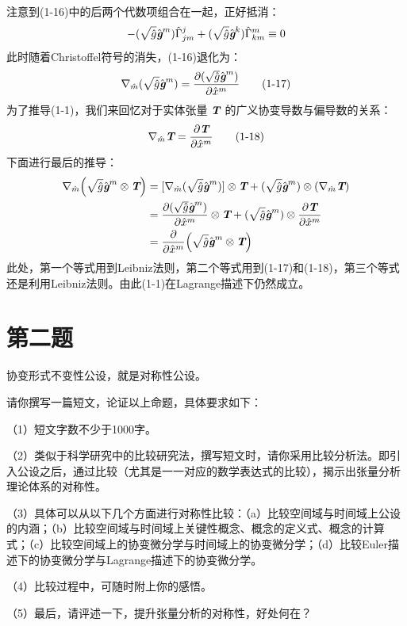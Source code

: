 \documentclass[UTF8]{ctexart}
\begin{document}
注意到(1-16)中的后两个代数项组合在一起，正好抵消：
\begin{equation*}
    -(\sqrt{\hat{g}}\hat{\textit{\textbf{g}}}^m)\hat{\Gamma }_{jm}^j+ (\sqrt{\hat{g}}\hat{\textit{\textbf{g}}}^k)\hat{\Gamma }_{km}^m \equiv 0
\end{equation*}
此时随着Christoffel符号的消失，(1-16)退化为：
\begin{equation*}
     \nabla_{\hat{m}}(\sqrt{\hat{g}}\hat{\textit{\textbf{g}}}^m)=\frac{\partial (\sqrt{\hat{g}}\hat{\textit{\textbf{g}}}^m)}{\partial \hat{x}^m}\tag{1-17}
\end{equation*}
为了推导(1-1)，我们来回忆对于实体张量 $\textit{\textbf{T}} $ 的广义协变导数与偏导数的关系：
\begin{equation*}
    \nabla_{\hat{m}}\textit{\textbf{T}} = \frac{\partial\textit{\textbf{T}} }{\partial \hat{x}^m}\tag{1-18}
\end{equation*}
下面进行最后的推导：
\begin{align*}
    \nabla_{\hat{m}} \Big(\sqrt{\hat{g}}\hat{\textit{\textbf{g}}}^m\otimes \textit{\textbf{T}} \Big) &=[ \nabla_{\hat{m}} (\sqrt{\hat{g}}\hat{\textit{\textbf{g}}}^m)] \otimes \textit{\textbf{T}} + (\sqrt{\hat{g}}\hat{\textit{\textbf{g}}}^m) \otimes (\nabla_{\hat{m}} \textit{\textbf{T}})\\
    &=\frac{\partial (\sqrt{\hat{g}}\hat{\textit{\textbf{g}}}^m)}{\partial \hat{x}^m} \otimes \textit{\textbf{T}} + (\sqrt{\hat{g}}\hat{\textit{\textbf{g}}}^m) \otimes \frac{\partial\textit{\textbf{T}} }{\partial \hat{x}^m}\\
    &=\frac{\partial}{\partial \hat{x}^m}\Big(\sqrt{\hat{g}}\hat{\textit{\textbf{g}}}^m\otimes \textit{\textbf{T}} \Big) 
\end{align*}
此处，第一个等式用到Leibniz法则，第二个等式用到(1-17)和(1-18)，第三个等式还是利用Leibniz法则。由此(1-1)在Lagrange描述下仍然成立。\par

\section{第二题}
\begin{center}
\fontsize{18pt}{18pt}\selectfont
协变形式不变性公设，就是对称性公设。
\end{center}

请你撰写一篇短文，论证以上命题，具体要求如下：\par

（1）短文字数不少于1000字。\par
（2）类似于科学研究中的比较研究法，撰写短文时，请你采用比较分析法。即引入公设之后，通过比较（尤其是一一对应的数学表达式的比较），揭示出张量分析理论体系的对称性。\par
（3）具体可以从以下几个方面进行对称性比较：（a）比较空间域与时间域上公设的内涵；（b）比较空间域与时间域上关键性概念、概念的定义式、概念的计算式；（c）比较空间域上的协变微分学与时间域上的协变微分学；（d）比较Euler描述下的协变微分学与Lagrange描述下的协变微分学。\par
（4）比较过程中，可随时附上你的感悟。\par
（5）最后，请评述一下，提升张量分析的对称性，好处何在？\vspace{2\baselineskip}
\end{document}
